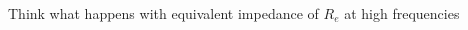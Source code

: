 \documentclass[beamer]{standalone}
\begin{document}
\begin{frame}
\begin{columns}[t]
\begin{column}{.45\textwidth}
\begin{figure}
  \end{figure}
  Think what happens with equivalent impedance of $R_e$ at high
  frequencies
 \end{column}
\end{columns}
\end{frame}
\end{document}
